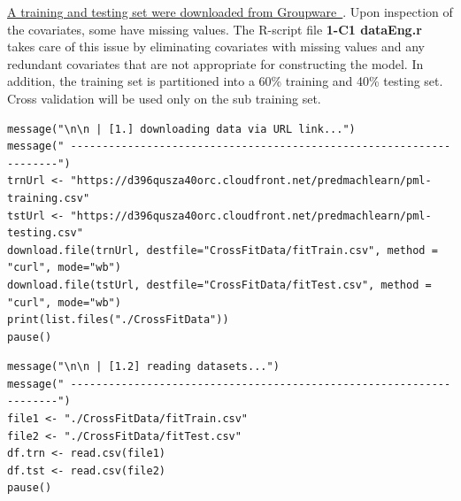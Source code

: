 \documentclass[10pt, twoside]{article}
\let\orighref\href
\renewcommand{\href}[2]{\orighref{#1}{#2\,\faExternalLink}}
\begin{document}
\noindent
\href{http://web.archive.org/web/20161224072740/http:/groupware.les.inf.puc-rio.br/har}{A training and testing set were downloaded from Groupware  }.
Upon inspection of the covariates, some have missing values. The R-script file
\textbf{1-C1 dataEng.r} takes care of this issue by eliminating covariates with missing values
and any redundant covariates that are not appropriate for constructing the model. In
addition, the training set is partitioned into a 60\% training and 40\% testing set. Cross
validation will be used only on the sub training set.
\bigskip

\begin{verbatim}
message("\n\n | [1.] downloading data via URL link...")
message(" --------------------------------------------------------------------")
trnUrl <- "https://d396qusza40orc.cloudfront.net/predmachlearn/pml-training.csv"
tstUrl <- "https://d396qusza40orc.cloudfront.net/predmachlearn/pml-testing.csv"
download.file(trnUrl, destfile="CrossFitData/fitTrain.csv", method = "curl", mode="wb")
download.file(tstUrl, destfile="CrossFitData/fitTest.csv", method = "curl", mode="wb")
print(list.files("./CrossFitData"))
pause()
\end{verbatim}

\begin{verbatim}
message("\n\n | [1.2] reading datasets...")
message(" --------------------------------------------------------------------")
file1 <- "./CrossFitData/fitTrain.csv"
file2 <- "./CrossFitData/fitTest.csv"
df.trn <- read.csv(file1)
df.tst <- read.csv(file2)
pause()
\end{verbatim}
\end{document}
